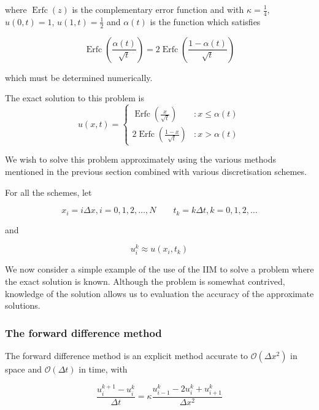 where $\operatorname{Erfc}(z)$ is the complementary error function and with $\kappa = \frac{1}{4}$, $u(0,t) = 1$, $u(1,t) = \frac{1}{2}$ and $\alpha(t)$ is the function which satisfies

\begin{equation}
    \operatorname{Erfc}\left(\frac{\alpha(t)}{\sqrt{t}}\right) = 2 \operatorname{Erfc}\left(\frac{1-\alpha(t)}{\sqrt{t}}\right)
\end{equation}

which must be determined numerically.

The exact solution to this problem is
\begin{equation}
    u(x,t) =  \left\{
    \begin{array}{lr}
        \operatorname{Erfc}(\frac{x}{\sqrt{t}}) & : x \leq \alpha(t) \\
        2 \operatorname{Erfc}(\frac{1-x}{\sqrt{t}}) & : x > \alpha(t)
        \end{array}
    \right.
\end{equation}

We wish to solve this problem approximately using the various methods mentioned in the previous section combined with various discretisation schemes.

For all the schemes, let

\begin{equation}
    x_i = i \Delta x, i = 0, 1, 2, \ldots, N \qquad t_k = k \Delta t, k = 0, 1, 2, \ldots
\end{equation}

and 

\begin{equation}
    u_i^k \approx u(x_i,t_k)
\end{equation}

We now consider a simple example of the use of the IIM to solve a problem where the exact solution is known.
Although the problem is somewhat contrived, knowledge of the solution allows us to evaluation the accuracy of the approximate solutions.

\subsubsection{The forward difference method}

The forward difference method is an explicit method accurate to $\mathcal{O}(\Delta x^2)$ in space and $\mathcal{O}(\Delta t)$ in time, with

\begin{equation}
    \frac{u_i^{k+1} - u_i^k}{\Delta t} = \kappa \frac{u_{i-1}^k - 2 u_i^k + u_{i+1}^k}{\Delta x^2}
\end{equation}

